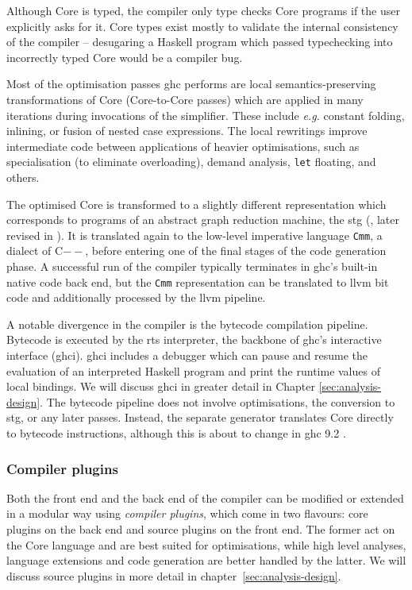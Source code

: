 \documentclass[thesis=B,english]{FITthesis}[2019/12/23]
\newcommand{\eg}{\emph{e.g.}\xspace}
\newcommand{\hsCode}[1]{\texttt{#1}}
\begin{document}
Although Core is typed, the compiler only type checks Core programs if the user
explicitly asks for it. Core types exist mostly to validate the internal
consistency of the compiler -- desugaring a Haskell program which passed
typechecking into incorrectly typed Core would be a compiler bug.

Most of the optimisation passes \acrshort{ghc} performs are local
semantics-pre\-serv\-ing transformations of Core (Core-to-Core passes) which
are applied in many iterations during invocations of the
simplifier\cite{cmtary-core2core}. These include \eg constant folding,
inlining, or fusion of nested case expressions. The local rewritings improve
intermediate code between applications of heavier optimisations, such as
specialisation (to eliminate overloading), demand analysis, \hsCode{let}
floating, and others.

The optimised Core is transformed to a slightly different representation which
corresponds to programs of an abstract graph reduction machine, the
\acrfull{stg} (\cite{stg-classic}, later revised in \cite{stg2}). It is
translated again to the low-level imperative language \texttt{Cmm}, a dialect
of C$--$, before entering one of the final stages of the code generation phase.
A successful run of the compiler typically terminates in \acrshort{ghc}'s
built-in native code back end, but the \texttt{Cmm} representation can be
translated to \acrshort{llvm} bit code and additionally processed by the
\acrshort{llvm} pipeline.

A notable divergence in the compiler is the bytecode compilation pipeline.
Bytecode is executed by the \acrshort{rts} interpreter, the backbone of
\acrshort{ghc}'s interactive interface (\acrshort{ghci}). \acrshort{ghci}
includes a debugger which can pause and resume the evaluation of an interpreted
Haskell program and print the runtime values of local bindings. We will discuss
\acrshort{ghci} in greater detail in Chapter \ref{sec:analysis-design}. The
bytecode pipeline does not involve optimisations, the conversion to
\acrshort{stg}, or any later passes. Instead, the separate generator translates
Core directly to bytecode instructions, although this is about to change in
\acrshort{ghc} 9.2 \cite{mr-ghci-stg-unboxed}.

\subsubsection*{Compiler plugins}
Both the front end and the back end of the compiler can be modified or extended
in a modular way using \textit{compiler plugins}, which come in two flavours:
core plugins on the back end and source plugins on the front
end\cite{ghc-source-plugins}. The former act on the Core language and are best
suited for optimisations, while high level analyses, language extensions and
code generation are better handled by the latter. We will discuss source
plugins in more detail in chapter~\ref{sec:analysis-design}.
\end{document}
